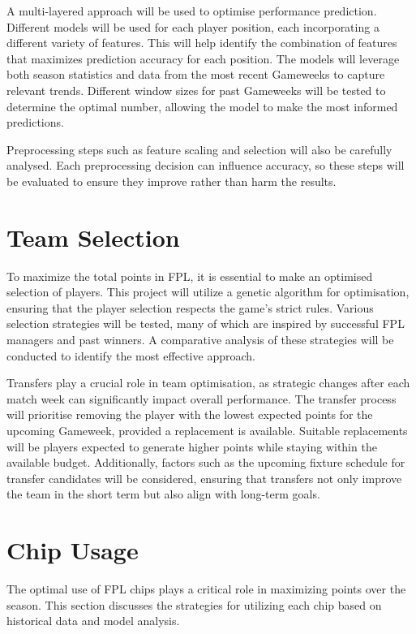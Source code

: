 
A multi-layered approach will be used to optimise performance prediction. Different models will be used for each player position, each incorporating a different variety of features. This will help identify the combination of features that maximizes prediction accuracy for each position. The models will leverage both season statistics and data from the most recent Gameweeks to capture relevant trends. Different window sizes for past Gameweeks will be tested to determine the optimal number, allowing the model to make the most informed predictions. 

Preprocessing steps such as feature scaling and selection will also be carefully analysed. Each preprocessing decision can influence accuracy, so these steps will be evaluated to ensure they improve rather than harm the results.

\section{Team Selection}

To maximize the total points in FPL, it is essential to make an optimised selection of players. This project will utilize a genetic algorithm for optimisation, ensuring that the player selection respects the game's strict rules. Various selection strategies will be tested, many of which are inspired by successful FPL managers and past winners. A comparative analysis of these strategies will be conducted to identify the most effective approach.

Transfers play a crucial role in team optimisation, as strategic changes after each match week can significantly impact overall performance. The transfer process will prioritise removing the player with the lowest expected points for the upcoming Gameweek, provided a replacement is available. Suitable replacements will be players expected to generate higher points while staying within the available budget. Additionally, factors such as the upcoming fixture schedule for transfer candidates will be considered, ensuring that transfers not only improve the team in the short term but also align with long-term goals.

\section{Chip Usage}
The optimal use of FPL chips plays a critical role in maximizing points over the season. This section discusses the strategies for utilizing each chip based on historical data and model analysis.

